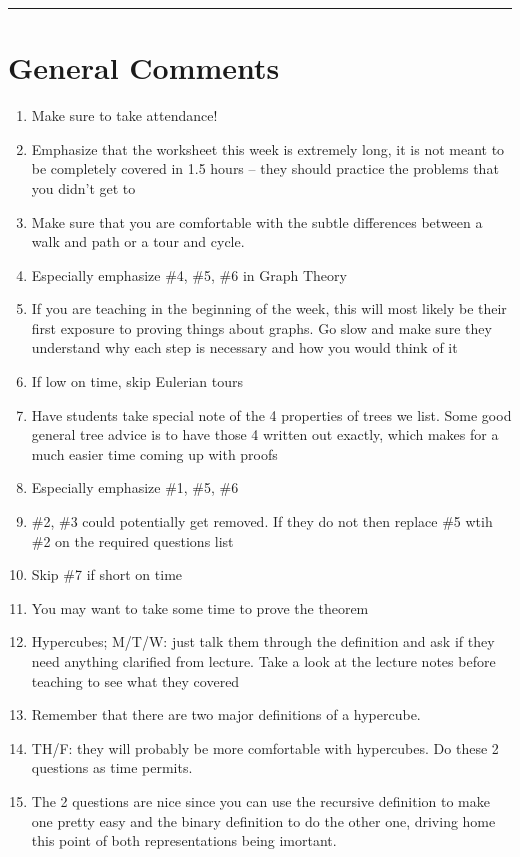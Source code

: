 \documentclass{exam}
\title{}
\date{Graphs, Trees, Hypercubes}
\begin{document}
\maketitle
\rule{\textwidth}{0.15em}
\fontsize{12}{15}\selectfont
\thispagestyle{empty}


\section{General Comments}
\begin{enumerate}
\item Make sure to take attendance!
\item Emphasize that the worksheet this week is extremely long, it is not meant to be completely covered in 1.5 hours -- they should practice the problems that you didn’t get to
\item Make sure that you are comfortable with the subtle differences between a walk and path or a tour and cycle. 
\item Especially emphasize \#4, \#5, \#6 in Graph Theory
\item If you are teaching in the beginning of the week, this will most likely be their first exposure to proving things about graphs. Go slow and make sure they understand why each step is necessary and how you would think of it
\item If low on time, skip Eulerian tours
\item Have students take special note of the 4 properties of trees we list. Some good general tree advice is to have those 4 written out exactly, which makes for a much easier time coming up with proofs
\item Especially emphasize \#1, \#5, \#6 
\item \#2, \#3 could potentially get removed. If they do not then replace \#5 wtih \#2 on the required questions list
\item Skip \#7 if short on time
\item You may want to take some time to prove the theorem
\item Hypercubes; M/T/W: just talk them through the definition and ask if they need anything clarified from lecture. Take a look at the lecture notes before teaching to see what they covered
\item Remember that there are two major definitions of a hypercube. 
\item TH/F: they will probably be more comfortable with hypercubes. Do these 2 questions as time permits.
\item The 2 questions are nice since you can use the recursive definition to make one pretty easy and the binary definition to do the other one, driving home this point of both representations being imortant.
\end{enumerate}
\end{document}
